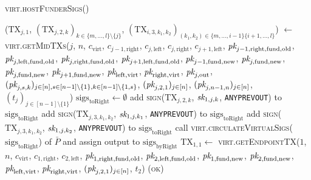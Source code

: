 \begin{center}
  \begin{processbox}{\textsc{virt.hostFunderSigs}()}
    \begin{algorithmic}[1]
        \State ($\mathrm{TX}_{j, 1}$, $(\mathrm{TX}_{j, 2, k})_{k \in \{m,
        \dots, l\} \setminus \{j\}}$, $(\mathrm{TX}_{i, 3, k_1, k_2})_{(k_1,
        k_2) \in \{m, \dots, i-1\} \{i+1, \dots, l\}}$) $\gets$
        \textsc{virt.getMidTXs}($j$, $n$, $c_{\mathrm{virt}}$, $c_{j-1,
        \mathrm{right}}$, $c_{j, \mathrm{left}}$, $c_{j, \mathrm{right}}$,
        $c_{j+1, \mathrm{left}}$, $\textit{pk}_{j-1, \mathrm{right}, \mathrm{fund},
        \mathrm{old}}$, $\textit{pk}_{j, \mathrm{left}, \mathrm{fund}, \mathrm{old}}$,
        $\textit{pk}_{j, \mathrm{right}, \mathrm{fund}, \mathrm{old}}$, $\textit{pk}_{j+1,
        \mathrm{left}, \mathrm{fund}, \mathrm{old}}$, $\textit{pk}_{j-1, \mathrm{fund},
        \mathrm{new}}$, $\textit{pk}_{j, \mathrm{fund}, \mathrm{new}}$, $\textit{pk}_{j,
        \mathrm{fund}, \mathrm{new}}$, $\textit{pk}_{j+1, \mathrm{fund}, \mathrm{new}}$,
        $\textit{pk}_{\mathrm{left}, \mathrm{virt}}$, $\textit{pk}_{\mathrm{right},
        \mathrm{virt}}$, $\textit{pk}_{j, \mathrm{out}}$, $(\textit{pk}_{j,s,k})_{j \in [n], s \in
        [n-1] \setminus \{1\}, k \in [n-1] \setminus \{1, s\}}$, $(\textit{pk}_{j, 2,
        1})_{j \in [n]}$, $(\textit{pk}_{j, n-1, n})_{j \in [n]}$, $(t_j)_{j \in [n-1]
        \setminus \{1\}}$)
        \State $\mathrm{sigs}_{\mathrm{toRight}} \gets \emptyset$
          \State add \textsc{sign}($\mathrm{TX}_{j, 2, k}$, $\textit{sk}_{1, j, k}$,
          \texttt{ANYPREVOUT}) to $\mathrm{sigs}_{\mathrm{toRight}}$
        \EndFor
          \State add \textsc{sign}($\mathrm{TX}_{j, 3, k_1, k_2}$, $\textit{sk}_{1, j,
          k_1}$, \texttt{ANYPREVOUT}) to $\mathrm{sigs}_{\mathrm{toRight}}$
          \State add \textsc{sign}($\mathrm{TX}_{j, 3, k_1, k_2}$, $\textit{sk}_{1, j,
          k_2}$, \texttt{ANYPREVOUT}) to $\mathrm{sigs}_{\mathrm{toRight}}$
        \EndFor
      \EndFor
      \State call
      \textsc{virt.circulateVirtualSigs}($\mathrm{sigs}_{\mathrm{toRight}}$)
      of $\bar{P}$ and assign output to $\mathrm{sigs}_{\mathrm{byRight}}$
      \State $\mathrm{TX}_{1, 1} \gets$
      \textsc{virt}.\textsc{getEndpointTX}($1$, $n$, $c_{\mathrm{virt}}$,
      $c_{1, \mathrm{right}}$, $c_{2, \mathrm{left}}$, $\textit{pk}_{1,
      \mathrm{right}, \mathrm{fund}, \mathrm{old}}$, $\textit{pk}_{2, \mathrm{left},
      \mathrm{fund}, \mathrm{old}}$, $\textit{pk}_{1, \mathrm{fund}, \mathrm{new}}$,
      $\textit{pk}_{2, \mathrm{fund}, \mathrm{new}}$, $\textit{pk}_{\mathrm{left},
      \mathrm{virt}}$, $\textit{pk}_{\mathrm{right}, \mathrm{virt}}$, $(\textit{pk}_{j, 2,
      1})_{j \in [n]}$, $t_2$)
      \label{code:virtual-layer:fundee-sigs:tx}
      \label{code:virtual-layer:funder-sigs:tx-none}
      \State \Return (\textsc{ok})
    \end{algorithmic}
  \end{processbox}
  \label{code:virtual-layer:funder-sigs}
\end{center} \ \\

